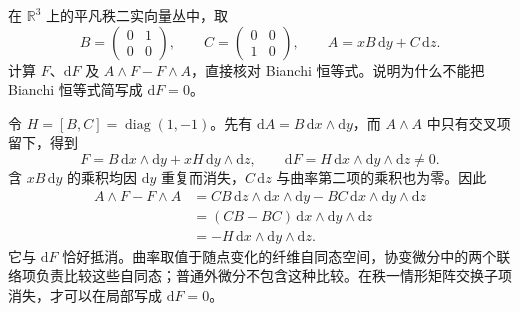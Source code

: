 \begin{exercise}\label{g1:ex:bianchi-nonclosed-matrix}
	在 \(\mathbb R^3\) 上的平凡秩二实向量丛中，取
	\[
		B=\begin{pmatrix}0&1\\0&0\end{pmatrix},\qquad
		C=\begin{pmatrix}0&0\\1&0\end{pmatrix},\qquad
		A=xB\,\mathrm{d}y+C\,\mathrm{d}z.
	\]
	计算 \(F\)、\(\mathrm{d}F\) 及 \(A\wedge F-F\wedge A\)，直接核对 Bianchi 恒等式。说明为什么不能把 Bianchi 恒等式简写成 \(\mathrm{d}F=0\)。
\end{exercise}
\begin{solution}
	令 \(H=[B,C]=\operatorname{diag}(1,-1)\)。先有 \(\mathrm{d}A=B\,\mathrm{d}x\wedge\mathrm{d}y\)，而 \(A\wedge A\) 中只有交叉项留下，得到
	\[
		F=B\,\mathrm{d}x\wedge\mathrm{d}y+xH\,\mathrm{d}y\wedge\mathrm{d}z,
		\qquad\mathrm{d}F=H\,\mathrm{d}x\wedge\mathrm{d}y\wedge\mathrm{d}z\ne0.
	\]
	含 \(xB\,\mathrm{d}y\) 的乘积均因 \(\mathrm{d}y\) 重复而消失，\(C\,\mathrm{d}z\) 与曲率第二项的乘积也为零。因此
	\begin{align*}
		A\wedge F-F\wedge A
		&=CB\,\mathrm{d}z\wedge\mathrm{d}x\wedge\mathrm{d}y-BC\,\mathrm{d}x\wedge\mathrm{d}y\wedge\mathrm{d}z\\
		&=(CB-BC)\,\mathrm{d}x\wedge\mathrm{d}y\wedge\mathrm{d}z\\
		&=-H\,\mathrm{d}x\wedge\mathrm{d}y\wedge\mathrm{d}z.
	\end{align*}
	它与 \(\mathrm{d}F\) 恰好抵消。曲率取值于随点变化的纤维自同态空间，协变微分中的两个联络项负责比较这些自同态；普通外微分不包含这种比较。在秩一情形矩阵交换子项消失，才可以在局部写成 \(\mathrm{d}F=0\)。
\end{solution}

